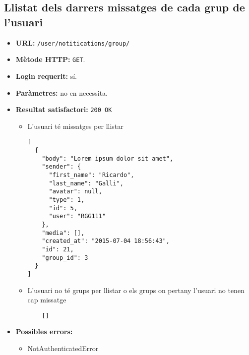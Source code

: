 \subsection{Llistat dels darrers missatges de cada grup de l'usuari}
\begin{itemize}
\item \textbf{\ac{URL}:} \texttt{/user/notitications/group/}
\item \textbf{Mètode \ac{HTTP}: } \texttt{GET}.
\item \textbf{Login requerit:} sí.
\item \textbf{Paràmetres:} no en necessita.

\item \textbf{Resultat satisfactori:} \texttt{200 OK}
	\begin{itemize}
		\item L'usuari té missatges per llistar
	\begin{verbatim}
[
  {
    "body": "Lorem ipsum dolor sit amet",
    "sender": {
      "first_name": "Ricardo",
      "last_name": "Galli",
      "avatar": null,
      "type": 1,
      "id": 5,
      "user": "RGG111"
    },
    "media": [],
    "created_at": "2015-07-04 18:56:43",
    "id": 21,
    "group_id": 3
  }
]
	\end{verbatim}
	
	\item L'usuari no té grups per llistar o els grups on pertany l'usuari no tenen cap missatge
	
	\begin{verbatim}
	[]
	\end{verbatim}
	\end{itemize}


\item \textbf{Possibles errors:}
	\begin{itemize}
		\item NotAuthenticatedError
	\end{itemize}
\end{itemize}
